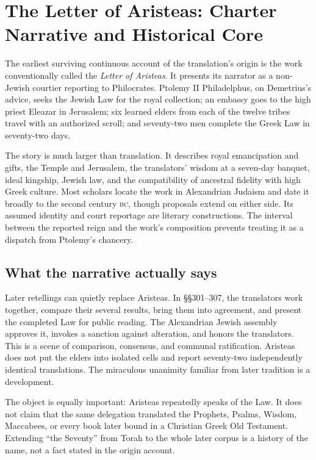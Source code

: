 \section{The Letter of Aristeas: Charter Narrative and Historical Core}

The earliest surviving continuous account of the translation's origin is the work conventionally called the \emph{Letter of Aristeas}. It presents its narrator as a non-Jewish courtier reporting to Philocrates. Ptolemy II Philadelphus, on Demetrius's advice, seeks the Jewish Law for the royal collection; an embassy goes to the high priest Eleazar in Jerusalem; six learned elders from each of the twelve tribes travel with an authorized scroll; and seventy-two men complete the Greek Law in seventy-two days.

The story is much larger than translation. It describes royal emancipation and gifts, the Temple and Jerusalem, the translators' wisdom at a seven-day banquet, ideal kingship, Jewish law, and the compatibility of ancestral fidelity with high Greek culture. Most scholars locate the work in Alexandrian Judaism and date it broadly to the second century \textsc{bc}, though proposals extend on either side. Its assumed identity and court reportage are literary constructions. The interval between the reported reign and the work's composition prevents treating it as a dispatch from Ptolemy's chancery.

\subsection{What the narrative actually says}

Later retellings can quietly replace Aristeas. In \S\S301--307, the translators work together, compare their several results, bring them into agreement, and present the completed Law for public reading. The Alexandrian Jewish assembly approves it, invokes a sanction against alteration, and honors the translators. This is a scene of comparison, consensus, and communal ratification. Aristeas does not put the elders into isolated cells and report seventy-two independently identical translations. The miraculous unanimity familiar from later tradition is a development.

The object is equally important: Aristeas repeatedly speaks of the Law. It does not claim that the same delegation translated the Prophets, Psalms, Wisdom, Maccabees, or every book later bound in a Christian Greek Old Testament. Extending “the Seventy” from Torah to the whole later corpus is a history of the name, not a fact stated in the origin account.

